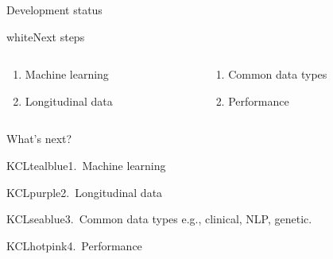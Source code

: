 \documentclass[11pt]{beamer}
\begin{document}
\begin{frame}[t]{Development status}
	\begin{cbox}{white}{Next steps}
		\begin{columns}
			\begin{column}[T]{0.45\textwidth}
				\begin{enumerate}
					\item[1.] \textcolor{KCLpurple}{Machine learning}
					\item[2.] \textcolor{KCLpurple}{Longitudinal data}
				\end{enumerate}
			\end{column}
			\begin{column}[T]{0.45\textwidth}
				\begin{enumerate}
					\item[3.] \textcolor{KCLpurple}{Common data types}
					\item[4.] \textcolor{KCLpurple}{Performance}
				\end{enumerate}
			\end{column}
		\end{columns}
	\end{cbox}


\end{frame}

\begin{frame}[t]{What's next?}
\begin{cbox}{KCLtealblue}{1.\ Machine learning}{}

\end{cbox}

\begin{cbox}{KCLpurple}{2.\ Longitudinal data}{}

\end{cbox}

\begin{cbox}{KCLseablue}{3.\ Common data types}{}
    e.g., clinical, NLP, genetic.

\end{cbox}

\begin{cbox}{KCLhotpink}{4.\ Performance}{}

\end{cbox}

\end{frame}
\end{document}
